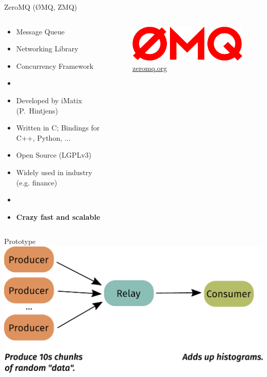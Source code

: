 \documentclass[aspectratio=1610,compress,titleprogressbar]{beamer}
\begin{document}
\begin{frame}{ZeroMQ (ØMQ, ZMQ)}
  \begin{columns}
    \begin{column}{.6\textwidth}
      \begin{itemize}
        \item Message Queue
        \item Networking Library
        \item Concurrency Framework
        \item [] {}
        \item Developed by iMatix (P.~Hintjens)
        \item Written in C; Bindings for C++, Python, ...
        \item Open Source (LGPLv3)
        \item Widely used in industry (e.g. finance)
        \item [] {}
        \item \textbf{Crazy fast and scalable}
      \end{itemize}
    \end{column}
    \begin{column}{.4\textwidth}
      \begin{figure}
        \centering
        \includegraphics[width=.8\textwidth]{graphics/zmq.png}
        \caption{\href{http://zeromq.org}{zeromq.org}}
      \end{figure}
    \end{column}
  \end{columns}
\end{frame}

\begin{frame}{Prototype}
  \includegraphics[width=\textwidth]{graphics/flow.pdf}
\end{frame}
\end{document}
